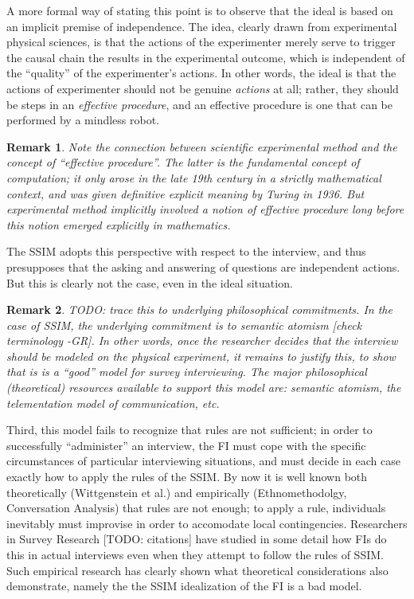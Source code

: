 \documentclass[11pt,twoside]{article}
\newtheorem{remark}{Remark}
\newcommand{\SR}{Survey Research}
\begin{document}
A more formal way of stating this point is to observe that the ideal
is based on an implicit premise of independence.  The idea, clearly
drawn from experimental physical sciences, is that the actions of the
experimenter merely serve to trigger the causal chain the results in
the experimental outcome, which is independent of the ``quality'' of
the experimenter's actions.  In other words, the ideal is that the
actions of experimenter should not be genuine \textit{actions} at all;
rather, they should be steps in an \textit{effective procedure}, and an
effective procedure is one that can be performed by a mindless robot.

\begin{remark}
  Note the connection between scientific experimental method and the
  concept of ``effective procedure''.  The latter is the fundamental
  concept of computation; it only arose in the late 19th century in a
  strictly mathematical context, and was given definitive explicit
  meaning by Turing in 1936.  But experimental method implicitly
  involved a notion of effective procedure long before this notion
  emerged explicitly in mathematics.
\end{remark}

The SSIM adopts this perspective with respect to the interview, and
thus presupposes that the asking and answering of questions are
independent actions.  But this is clearly not the case, even in the
ideal situation.

\begin{remark}
  TODO: trace this to underlying philosophical commitments.  In the
  case of SSIM, the underlying commitment is to semantic atomism
  [check terminology -GR].  In other words, once the researcher
  decides that the interview should be modeled on the physical
  experiment, it remains to justify this, to show that is is a
  ``good'' model for survey interviewing.  The major philosophical
  (theoretical) resources available to support this model are:
  semantic atomism, the telementation model of communication, etc.
\end{remark}

Third, this model fails to recognize that rules are not sufficient; in
order to successfully ``administer'' an interview, the FI must cope
with the specific circumstances of particular interviewing situations,
and must decide in each case exactly how to apply the rules of the
SSIM.  By now it is well known both theoretically (Wittgenstein et
al.) and empirically (Ethnomethodolgy, Conversation Analysis) that
rules are not enough; to apply a rule, individuals inevitably must
improvise in order to accomodate local contingencies.  Researchers in
\SR{} [TODO: citations] have studied in some detail how FIs do this in
actual interviews even when they attempt to follow the rules of SSIM.
Such empirical research has clearly shown what theoretical
considerations also demonstrate, namely the the SSIM idealization of
the FI is a bad model.
\end{document}
